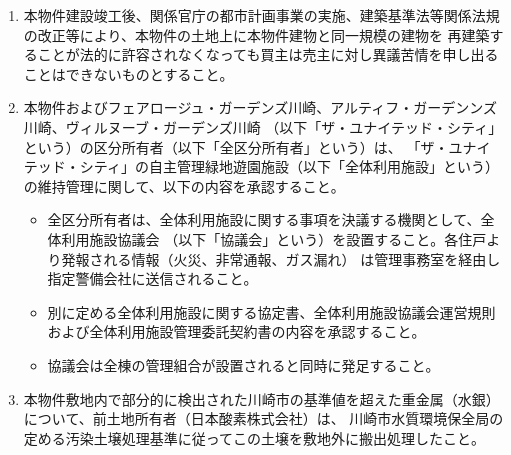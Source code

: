 \documentclass[
  twoside,
  luatex,
  paper=a4paper,
  fontsize=11pt,
  jafontsize=11pt,
  jlreq_notes,
]{jlreq}
\begin{document}
\begin{enumerate}
        あること（「ザ・ユナイテッド・シティ」全体概略図参照）。
  \item 本物件建設竣工後、関係官庁の都市計画事業の実施、建築基準法等関係法規の改正等により、本物件の土地上に本物件建物と同一規模の建物を
        再建築することが法的に許容されなくなっても買主は売主に対し異議苦情を申し出ることはできないものとすること。
  \item 本物件およびフェアロージュ・ガーデンズ川崎、アルティフ・ガーデンンズ川崎、ヴィルヌーブ・ガーデンズ川崎
        （以下「ザ・ユナイテッド・シティ」という）の区分所有者（以下「全区分所有者」という）は、
        「ザ・ユナイテッド・シティ」の自主管理緑地遊園施設（以下「全体利用施設」という）の維持管理に関して、以下の内容を承認すること。
          \begin{itemize}
            \item[① ] 全区分所有者は、全体利用施設に関する事項を決議する機関として、全体利用施設協議会
              （以下「協議会」という）を設置すること。各住戸より発報される情報（火災、非常通報、ガス漏れ）
              は管理事務室を経由し指定警備会社に送信されること。
            \item[② ] 別に定める全体利用施設に関する協定書、全体利用施設協議会運営規則および全体利用施設管理委託契約書の内容を承認すること。
            \item[③ ] 協議会は全棟の管理組合が設置されると同時に発足すること。
          \end{itemize}
  \item 本物件敷地内で部分的に検出された川崎市の基準値を超えた重金属（水銀）について、前土地所有者（日本酸素株式会社）は、
        川崎市水質環境保全局の定める汚染土壌処理基準に従ってこの土壌を敷地外に搬出処理したこと。
  \end{enumerate}
  
  \newpage

\end{document}
